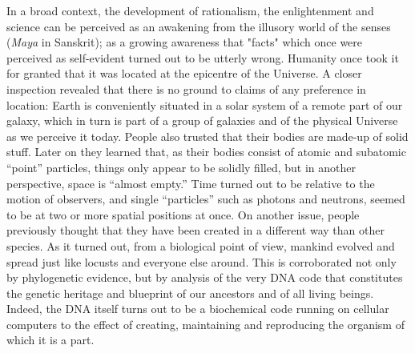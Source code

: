 \documentclass[pre,preprint,showpacs,showkeys,amsfonts]{revtex4}
\begin{document}
In a broad context,
the development of rationalism, the enlightenment
and science can be perceived as an
awakening from the illusory world of the senses ({\it Maya} in Sanskrit);
as a growing awareness that "facts" which once were perceived as self-evident
turned out to be utterly wrong.
Humanity once took it for granted that it was located at the epicentre of the Universe.
A closer inspection revealed that there is no ground to claims of any preference in location:
Earth is conveniently situated in a solar system of a remote part of our galaxy,
which in turn is part of a group of galaxies and of the physical
Universe as we perceive it today.
People also trusted that their bodies are made-up of solid stuff.
Later on they  learned that, as their bodies consist of atomic and subatomic ``point'' particles,
things only appear to be solidly filled, but in another perspective, space is ``almost empty.''
Time turned out to be relative to the motion of observers, and
single ``particles'' such as
photons and neutrons, seemed to be at two or more spatial positions at once.
On another issue, people previously thought that they have been created in a
different way than other species. As it turned out, from a biological point of view,
mankind evolved and spread just like locusts and everyone else around.
This is corroborated not only by phylogenetic evidence,
but by analysis of the very DNA code  that constitutes the genetic heritage
and blueprint of our ancestors and of all living beings.
Indeed, the DNA itself turns out to be a biochemical code running on
cellular computers to the effect of creating,
maintaining and reproducing the organism of which it is a part.
\end{document}
